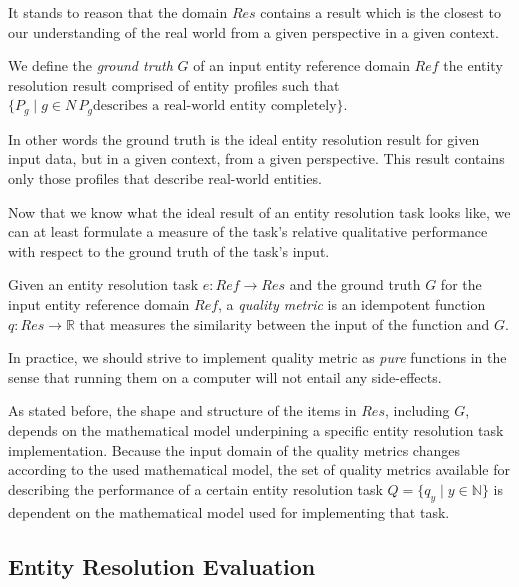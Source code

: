 \documentclass[lettersize,journal]{IEEEtran}
\begin{document}
    It stands to reason that the domain $Res$ contains a result which is the
    closest to our understanding of the real world from a given perspective in
    a given context.

    \begin{defn}
        We define the \textit{ground truth} $G$ of an input entity reference
        domain $Ref$ the entity resolution result comprised of entity profiles
        such that
        $\{P_g \mid g \in N\, P_g \textrm{describes a real-world entity completely}\}$.
    \end{defn}

    In other words the ground truth is the ideal entity resolution result for 
    given input data, but in a given context, from a given perspective.
    This result contains only those profiles that describe real-world entities.

    Now that we know what the ideal result of an entity resolution task looks
    like, we can at least formulate a measure of the task's relative qualitative
    performance with respect to the ground truth of the task's input.
    
    \begin{defn}
    Given an entity resolution task $e: Ref \rightarrow Res$ and the ground
    truth $G$ for the input entity reference domain $Ref$, a \textit{quality
    metric} is an idempotent function $q: Res \rightarrow \mathbb{R}$ that
    measures the similarity between the input of the function and $G$.
    \end{defn}

    In practice, we should strive to implement quality metric as \textit{pure}
    functions in the sense that running them on a computer will not entail any
    side-effects.

    As stated before, the shape and structure of the items in $Res$, including
    $G$, depends on the mathematical model underpining a specific entity
    resolution task implementation.
    Because the input domain of the quality metrics changes according to the
    used mathematical model, the set of quality metrics available for describing
    the performance of a certain entity resolution task $Q = \{q_y \mid y \in
    \mathbb{N}\}$ is dependent on the mathematical model used for implementing
    that task.

    \subsection[ere]{Entity Resolution Evaluation}\label{subsec:ere}
\end{document}
